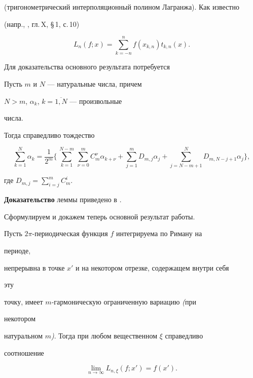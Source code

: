 (тригонометрический интерполяционный полином Лагранжа). Как известно


(напр., \cite{Zy}, гл.\,X, \S\,1, с.\,10)


$$


L_n(f;x)=\sum^n_{k=-n}f(x_{k,n})t_{k,n}(x).


$$





Для доказательства основного результата потребуется





\begin{lemnonum}


Пусть $m$ и $N$ --- натуральные числа, причем


$N>m$, $\alpha_k$, $k=\overline{1,N}$ --- произвольные


числа.





Тогда справедливо тождество


$$


\sum^N_{k=1}\alpha_k=\frac{1}{2^m}\biggl\{\,


\sum^{N-m}_{k=1}\,\sum^m_{\nu=0}C^\nu_m\alpha_{k+\nu}+


\sum^m_{j=1}D_{m,j}\alpha_j+\sum^N_{j=N-m+1}


D_{m,N-j+1}\alpha_j\biggr\},


$$


где $D_{m,j}=\sum\limits^m_{i=j}C^i_m$.


\end{lemnonum}





{\bf Доказательство} леммы приведено в \cite{K3}.





Сформулируем и докажем теперь основной результат работы.





\begin{thmnonum}


Пусть $2\pi$-периодическая функция $f$ интегрируема по Риману на


периоде,


непрерывна в точке $x'$ и на некотором отрезке, содержащем внутри себя


эту


точку, имеет $m$-гармоническую ограниченную вариацию {\em (}при


некотором


натуральном $m${\em )}. Тогда при любом вещественном $\xi$ справедливо


соотношение


$$


\lim_{n\to\infty}L_{n,\xi}(f;x')=f(x').


$$


\end{thmnonum}





